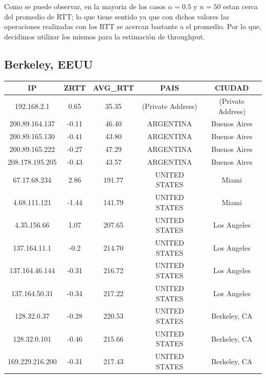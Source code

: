 Como se puede observar, en la mayoria de los casos $\alpha = 0.5$ y $n = 50$ estan cerca del promedio de RTT; lo que tiene sentido ya que con dichos valores las operaciones realizadas con los RTT se acercan bastante a el promedio. Por lo que, decidimos utilizar los mismos para la estimación de throughput.

\subsection{Berkeley, EEUU}

\begin{tabular}{|c@{\hspace{5ex}}c@{\hspace{5ex}}c@{\hspace{5ex}}c@{\hspace{5ex}}c|}
 \hline
 \rule{0pt}{1.2em}IP & ZRTT & AVG\_RTT & PAIS & CIUDAD\\[0.2em]
 \hline

\rule{0pt}{1.2em} 192.168.2.1  &  0.65 & 35.35 & (Private Address) & (Private Address) \\[0.2em]
\rule{0pt}{1.2em} 200.89.164.137  &  -0.11 & 46.40 & ARGENTINA & Buenos Aires \\[0.2em]
\rule{0pt}{1.2em} 200.89.165.130  &  -0.41 & 43.80 & ARGENTINA & Buenos Aires \\[0.2em]
\rule{0pt}{1.2em} 200.89.165.222  &  -0.27 & 47.29 & ARGENTINA & Buenos Aires \\[0.2em]
\rule{0pt}{1.2em} 208.178.195.205  &  -0.43 & 43.57 & ARGENTINA & Buenos Aires \\[0.2em]
\rule{0pt}{1.2em} 67.17.68.234  &  2.86 & 191.77 & UNITED STATES & Miami \\[0.2em]
\rule{0pt}{1.2em} 4.68.111.121  &  -1.44 & 141.79 & UNITED STATES & Miami \\[0.2em]
\rule{0pt}{1.2em} 4.35.156.66  &  1.07 & 207.65 & UNITED STATES & Los Angeles \\[0.2em]
\rule{0pt}{1.2em} 137.164.11.1  &  -0.2& 214.70 & UNITED STATES & Los Angeles \\[0.2em]
\rule{0pt}{1.2em} 137.164.46.144  &  -0.31 & 216.72 & UNITED STATES & Los Angeles \\[0.2em]
\rule{0pt}{1.2em} 137.164.50.31  &  -0.34 & 217.22 & UNITED STATES & Los Angeles \\[0.2em]
\rule{0pt}{1.2em} 128.32.0.37  &  -0.28 & 220.53 & UNITED STATES & Berkeley, CA \\[0.2em]
\rule{0pt}{1.2em} 128.32.0.101  &  -0.46 & 215.66 & UNITED STATES & Berkeley, CA \\[0.2em]
\rule{0pt}{1.2em} 169.229.216.200  &  -0.31 & 217.43 & UNITED STATES & Berkeley, CA \\[0.2em]
\hline
 \end{tabular}

